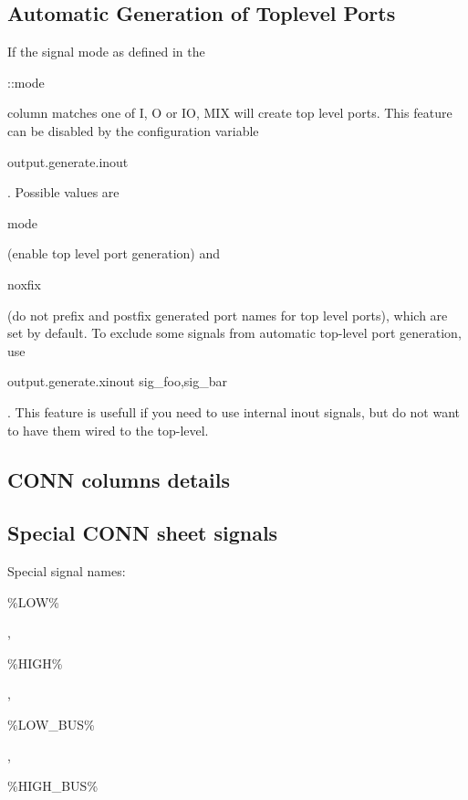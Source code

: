 \documentclass[a4paper,12pt]{article}
\begin{document}
\subsection{Automatic Generation of Toplevel Ports}

If the signal mode as defined in the \begin{tt}::mode\end{tt} column matches one of I, O or IO, MIX will create top level ports.
This feature can be disabled by the configuration variable \begin{tt}output.generate.inout\end{tt}. Possible values are
\begin{tt}mode\end{tt}(enable top level port generation) and \begin{tt}noxfix\end{tt}(do not prefix and postfix generated port names for
top level ports), which are set by default.
To exclude some signals from automatic top-level port generation, use 
\begin{tt}output.generate.xinout sig\_foo,sig\_bar\end{tt}. This feature is usefull if you need to use internal inout signals, but do
not want to have them wired to the top-level.

\subsection{CONN columns details}

\subsection{Special CONN sheet signals}
Special signal names:\newline
\begin{tt}\%LOW\%\end{tt}, \begin{tt}\%HIGH\%\end{tt}, \begin{tt}\%LOW\_BUS\%\end{tt}, \begin{tt}\%HIGH\_BUS\%\end{tt}\newline
\end{document}
